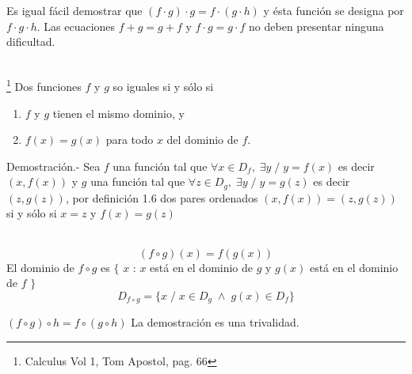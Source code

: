\begin{teo}
Es igual fácil demostrar que $(f\cdot g)\cdot g=f\cdot (g \cdot h)$ y ésta función se designa por $f \cdot g \cdot h$. Las ecuaciones $f+g=g+f$ \; y \; $f\cdot g=g \cdot f$ no deben presentar ninguna dificultad.\\\\
\end{teo}

\begin{teo}\footnote{Calculus Vol 1, Tom Apostol, pag. 66}
Dos funciones $f$ y $g$ so iguales si y sólo si
\begin{enumerate}[\bfseries a)]
\item $f$ y $g$ tienen el mismo dominio, y 
\item $f(x)=g(x)$ para todo $x$ del dominio de $f$.
\end{enumerate}
Demostración.- \; Sea $f$ una función tal que $\forall x \in D_f, \; \exists y \; / \; y=f(x)$ es decir $\left( x, f(x) \right)$ y $g$ una función tal que $\forall z \in D_g, \; \exists y \; / \; y=g(z)$ es decir $\left( z, g(z) \right)$, por definición 1.6 dos pares ordenados $\left( x, f(x) \right) = \left( z, g(z) \right)$ si y sólo si $x = z$ \; y \; $f(x)=g(z)$ \\\\    
\end{teo}


\begin{tcolorbox}
\begin{def.}
$$(f \circ g)(x)=f(g(x))$$
El dominio de $f\circ g$ es $\lbrace $ $x$ : $x$ está en el dominio de $g$ \: y \; $g(x)$ está en el dominio de $f$ $\rbrace$
$$D_{f \circ g}= \lbrace x \; / \; x \in D_g \; \land \; g(x)\in D_f \rbrace$$
\end{def.}
\begin{prop}
$(f \circ g) \circ h = f \circ (g \circ h)$   La demostración es una trivalidad.
\end{prop}
\end{tcolorbox}

